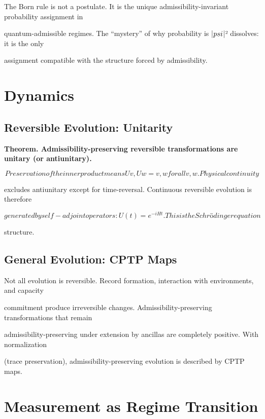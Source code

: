 \documentclass[11pt]{article}
\begin{document}
The Born rule is not a postulate. It is the unique admissibility-invariant probability assignment in

quantum-admissible regimes. The “mystery” of why probability is |$\\psi$|² dissolves: it is the only

assignment compatible with the structure forced by admissibility.



\section{Dynamics}



\subsection{Reversible Evolution: Unitarity}

\textbf{Theorem. Admissibility-preserving reversible transformations are unitary (or antiunitary).}

\[Preservation of the inner product means Uv, Uw = v, w for all v, w. Physical continuity\]

excludes antiunitary except for time-reversal. Continuous reversible evolution is therefore

\[generated by self-adjoint operators: U(t) = e^{-iHt}. This is the Schrödinger equation\]

structure.



\subsection{General Evolution: CPTP Maps}

Not all evolution is reversible. Record formation, interaction with environments, and capacity

commitment produce irreversible changes. Admissibility-preserving transformations that remain

admissibility-preserving under extension by ancillas are completely positive. With normalization

(trace preservation), admissibility-preserving evolution is described by CPTP maps.



\section{Measurement as Regime Transition}
\end{document}
